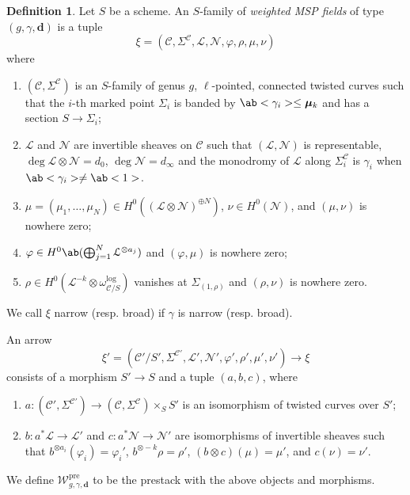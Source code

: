 \documentclass{amsart}
\theoremstyle{definition}
\newtheorem{defn}[thm]{Definition}
\theoremstyle{remark}
\theoremstyle{plain}
\theoremstyle{definition}
\theoremstyle{remark}
\newcommand{\mc}[1]{\mathcal{#1}}
\newcommand{\mbf}[1]{\mathbf{#1}}
\newcommand{\mr}[1]{\mathrm{#1}}
\newcommand{\1}{\mathbf{1}}
\newcommand{\2}{\mathbf{2}}
\newcommand{\3}{\mathbf{3}}
\newcommand{\bmu}{\bm{\mu}}
\newcommand{\pre}{\mr{pre}}
\begin{document}
\begin{defn}\label{defn:nmsp}
  Let $S$ be a scheme. An $S$-family of \textit{weighted MSP fields} of type $(g,\gamma, \mbf{d})$ is a tuple
  \[ \xi = (\mc{C}, \Sigma^{\mc{C}}, \mc{L}, \mc{N}, \varphi, \rho, \mu, \nu) \]
  where
  \begin{enumerate}
  \item $(\mc{C}, \Sigma^{\mc{C}})$ is an $S$-family of genus $g$, $\ell$-pointed, connected twisted curves such that the $i$-th marked point $\Sigma_i$ is banded by $\ab<\gamma_i> \leq \bmu_k$ and has a section $S \to \Sigma_i$;
  \item $\mc{L}$ and $\mc{N}$ are invertible sheaves on $\mc{C}$ such that $(\mc{L},\mc{N})$ is representable, $\deg \mc{L} \otimes \mc{N} = d_0$, $\deg \mc{N} = d_{\infty}$ and the monodromy of $\mc{L}$ along $\Sigma_i^{\mc{C}}$ is $\gamma_i$ when $\ab<\gamma_i> \neq \ab<1>$.
  \item $\mu = (\mu_1, \ldots, \mu_N) \in H^0((\mc{L} \otimes \mc{N})^{\oplus N})$, $\nu \in H^0(\mc{N})$, and $(\mu, \nu)$ is nowhere zero;
  \item $\varphi \in H^0\ab(\bigoplus_{j=1}^N \mc{L}^{\otimes a_j})$ and $(\varphi, \mu)$ is nowhere zero;
    \item $\rho \in H^0(\mc{L}^{-k} \otimes \omega_{\mc{C}/S}^{\log})$ vanishes at $\Sigma_{(1,\rho)}$ and $(\rho, \nu)$ is nowhere zero.
  \end{enumerate}
  We call $\xi$ narrow (resp. broad) if $\gamma$ is narrow (resp. broad).

  An arrow
  \[ \xi' = (\mc{C}'/S', \Sigma^{\mc{C}'}, \mc{L}', \mc{N}', \varphi', \rho', \mu', \nu') \to \xi \]
  consists of a morphism $S' \to S$ and a tuple $(a,b,c)$, where
  \begin{enumerate}
  \item $a \colon (\mc{C}', \Sigma^{\mc{C}'}) \to (\mc{C}, \Sigma^{\mc{C}}) \times_S S'$ is an isomorphism of twisted curves over $S'$;
    \item $b \colon a^* \mc{L} \to \mc{L}'$ and $c \colon a^* \mc{N} \to \mc{N}'$ are isomorphisms of invertible sheaves such that $b^{\otimes a_i}(\varphi_i) = \varphi_i'$, $b^{\otimes -k} \rho = \rho'$, $(b \otimes c)(\mu) = \mu'$, and $c(\nu) = \nu'$.
  \end{enumerate}

  We define $\mc{W}_{g,\gamma,\mbf{d}}^{\pre}$ to be the prestack with the above objects and morphisms.
\end{defn}
\end{document}
